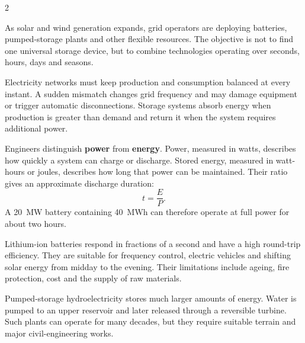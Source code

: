 

\begin{multicols}{2}

\begin{engineeringnews}
As solar and wind generation expands, grid operators are deploying batteries, pumped-storage plants and other flexible resources. The objective is not to find one universal storage device, but to combine technologies operating over seconds, hours, days and seasons.
\end{engineeringnews}

\begin{ecarticle}
Electricity networks must keep production and consumption balanced at every instant. A sudden mismatch changes grid frequency and may damage equipment or trigger automatic disconnections. Storage systems absorb energy when production is greater than demand and return it when the system requires additional power.

Engineers distinguish \textbf{power} from \textbf{energy}. Power, measured in watts, describes how quickly a system can charge or discharge. Stored energy, measured in watt-hours or joules, describes how long that power can be maintained. Their ratio gives an approximate discharge duration:
\[
t=\frac{E}{P}.
\]
A 20~MW battery containing 40~MWh can therefore operate at full power for about two hours.

Lithium-ion batteries respond in fractions of a second and have a high round-trip efficiency. They are suitable for frequency control, electric vehicles and shifting solar energy from midday to the evening. Their limitations include ageing, fire protection, cost and the supply of raw materials.

Pumped-storage hydroelectricity stores much larger amounts of energy. Water is pumped to an upper reservoir and later released through a reversible turbine. Such plants can operate for many decades, but they require suitable terrain and major civil-engineering works.


\end{ecarticle}
\end{multicols}
